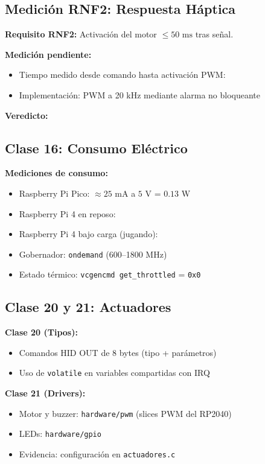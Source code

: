
\subsection{Medición RNF2: Respuesta Háptica}

\textbf{Requisito RNF2:} Activación del motor $\le 50\text{ ms}$ tras señal.

\textbf{Medición pendiente:}
\begin{itemize}
	\item Tiempo medido desde comando hasta activación PWM: 
	\item Implementación: PWM a 20 kHz mediante alarma no bloqueante
\end{itemize}

\textbf{Veredicto:} 

\subsection{Clase 16: Consumo Eléctrico}

\textbf{Mediciones de consumo:}
\begin{itemize}
	\item Raspberry Pi Pico: $\approx 25\text{ mA}$ a $5\text{ V}$ = $0.13\text{ W}$
	\item Raspberry Pi 4 en reposo: 
	\item Raspberry Pi 4 bajo carga (jugando): 
	\item Gobernador: \texttt{ondemand} (600--1800 MHz)
	\item Estado térmico: \texttt{vcgencmd get\_throttled} = \texttt{0x0}
\end{itemize}

\subsection{Clase 20 y 21: Actuadores}

\textbf{Clase 20 (Tipos):}
\begin{itemize}
	\item Comandos HID OUT de 8 bytes (tipo + parámetros)
	\item Uso de \texttt{volatile} en variables compartidas con IRQ
\end{itemize}

\textbf{Clase 21 (Drivers):}
\begin{itemize}
	\item Motor y buzzer: \texttt{hardware/pwm} (slices PWM del RP2040)
	\item LEDs: \texttt{hardware/gpio}
	\item Evidencia: configuración en \texttt{actuadores.c}
\end{itemize}
